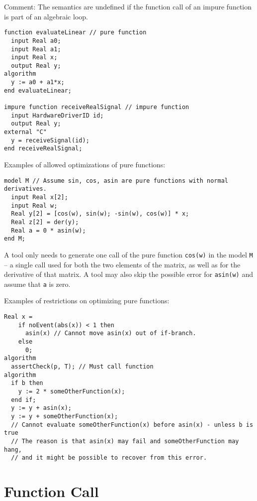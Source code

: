 \begin{nonnormative}
Comment: The semantics are undefined if the function call of an
impure function is part of an algebraic loop.
\end{nonnormative}

\begin{example}
\begin{lstlisting}[language=modelica]
function evaluateLinear // pure function
  input Real a0;
  input Real a1;
  input Real x;
  output Real y;
algorithm
  y := a0 + a1*x;
end evaluateLinear;

impure function receiveRealSignal // impure function
  input HardwareDriverID id;
  output Real y;
external "C"
  y = receiveSignal(id);
end receiveRealSignal;
\end{lstlisting}
Examples of allowed optimizations of pure functions:
\begin{lstlisting}[language=modelica]
model M // Assume sin, cos, asin are pure functions with normal derivatives.
  input Real x[2];
  input Real w;
  Real y[2] = [cos(w), sin(w); -sin(w), cos(w)] * x;
  Real z[2] = der(y);
  Real a = 0 * asin(w);
end M;
\end{lstlisting}
A tool only needs to generate one call of the pure function \lstinline!cos(w)! in the model \lstinline!M! -- a single call used for both the two elements of the matrix, as well as for the derivative
of that matrix.  A tool may also skip the possible error for \lstinline!asin(w)! and assume that \lstinline!a! is zero.

Examples of restrictions on optimizing pure functions:
\begin{lstlisting}[language=modelica]
  Real x =
    if noEvent(abs(x)) < 1 then
      asin(x) // Cannot move asin(x) out of if-branch.
    else
      0;
algorithm
  assertCheck(p, T); // Must call function
algorithm
  if b then
    y := 2 * someOtherFunction(x);
  end if;
  y := y + asin(x);
  y := y + someOtherFunction(x);
  // Cannot evaluate someOtherFunction(x) before asin(x) - unless b is true
  // The reason is that asin(x) may fail and someOtherFunction may hang,
  // and it might be possible to recover from this error.
\end{lstlisting}
\end{example}

\section{Function Call}\label{function-call}

